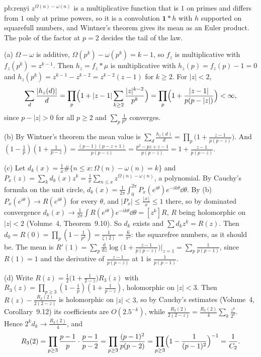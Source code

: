 \begin{solution}{pb:renyi}
\idea $z^{\Omega(n)-\omega(n)}$ is a multiplicative function that is $1$ on primes and differs from $1$ only at prime powers, so it is a convolution $\mathbf1*h$ with $h$ supported on
squarefull numbers, and Wintner's theorem gives its mean as an Euler product. The pole of the factor at $p=2$ decides the tail of the law.

\writeup (a) $\Omega-\omega$ is additive, $\Omega(p^k)-\omega(p^k)=k-1$, so $f_z$ is multiplicative with $f_z(p^k)=z^{k-1}$. Then $h_z=f_z*\mu$ is multiplicative with
$h_z(p)=f_z(p)-1=0$ and $h_z(p^k)=z^{k-1}-z^{k-2}=z^{k-2}(z-1)$ for $k\ge2$. For $|z|<2$,
\[
\sum_d\frac{|h_z(d)|}d=\prod_p\Bigl(1+|z-1|\sum_{k\ge2}\frac{|z|^{k-2}}{p^k}\Bigr)=\prod_p\Bigl(1+\frac{|z-1|}{p(p-|z|)}\Bigr)<\infty,
\]
since $p-|z|>0$ for all $p\ge2$ and $\sum_p\frac1{p^2}$ converges.

(b) By Wintner's theorem the mean value is $\sum_d\frac{h_z(d)}d=\prod_p\bigl(1+\frac{z-1}{p(p-z)}\bigr)$. And
$(1-\frac1p)(1+\frac1{p-z})=\frac{(p-1)(p-z+1)}{p(p-z)}=\frac{p^2-pz+z-1}{p(p-z)}=1+\frac{z-1}{p(p-z)}$.

(c) Let $d_k(x)=\frac1x\#\{n\le x:\Omega(n)-\omega(n)=k\}$ and $P_x(z)=\sum_kd_k(x)z^k=\frac1x\sum_{n\le x}z^{\Omega(n)-\omega(n)}$, a polynomial. By Cauchy's formula on the unit circle,
$d_k(x)=\frac1{2\pi}\int_0^{2\pi}P_x(e^{i\theta})e^{-ik\theta}\dd\theta$. By (b) $P_x(e^{i\theta})\to R(e^{i\theta})$ for every $\theta$, and $|P_x|\le\frac{\lfloor x\rfloor}x\le1$ there, so by dominated
convergence $d_k(x)\to\frac1{2\pi}\int R(e^{i\theta})e^{-ik\theta}\dd\theta=[z^k]R$, $R$ being holomorphic on $|z|<2$ (Volume~4, Theorem~9.10). So $d_k$ exists and $\sum d_kz^k=R(z)$.
Then $d_0=R(0)=\prod_p(1-\frac1{p^2})=\frac1{\zeta(2)}=\frac6{\pi^2}$: the squarefree numbers, as it should be. The mean is $R'(1)=\sum_p\frac{\mathrm d}{\mathrm dz}\log\bigl(1+\frac{z-1}{p(p-z)}\bigr)\big|_{z=1}=\sum_p\frac1{p(p-1)}$,
since $R(1)=1$ and the derivative of $\frac{z-1}{p(p-z)}$ at $1$ is $\frac1{p(p-1)}$.

(d) Write $R(z)=\frac12\bigl(1+\frac1{2-z}\bigr)R_3(z)$ with $R_3(z)=\prod_{p\ge3}(1-\frac1p)(1+\frac1{p-z})$, holomorphic on $|z|<3$. Then
$R(z)-\frac{R_3(2)}{2(2-z)}$ is holomorphic on $|z|<3$, so by Cauchy's estimates (Volume~4, Corollary~9.12) its coefficients are $O(2.5^{-k})$, while $\frac{R_3(2)}{2(2-z)}=\frac{R_3(2)}4\sum_k\frac{z^k}{2^k}$. Hence
$2^kd_k\to\frac{R_3(2)}4$, and
\[
R_3(2)=\prod_{p\ge3}\frac{p-1}p\cdot\frac{p-1}{p-2}=\prod_{p\ge3}\frac{(p-1)^2}{p(p-2)}=\prod_{p\ge3}\Bigl(1-\frac1{(p-1)^2}\Bigr)^{-1}=\frac1{C_2}.
\]


\end{solution}
